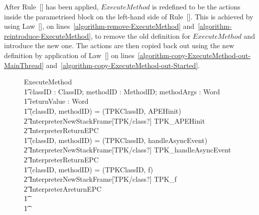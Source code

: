 After Rule~[] has been applied,
$ExecuteMethod$ is redefined to be the actions inside the parametrised
block on the left-hand side of
Rule~[].
This is achieved by using Law~[], on
lines~\ref{algorithm-remove-ExecuteMethod}
and~\ref{algorithm-reintroduce-ExecuteMethod}, to remove the old
definition for $ExecuteMethod$ and introduce the new one.
The actions are then copied back out using the new definition by
application of Law~[] on
lines~\ref{algorithm-copy-ExecuteMethod-out-MainThread}
and~\ref{algorithm-copy-ExecuteMethod-out-Started}.

\begin{figure}[tp!]
  \centering
  \setlength{\zedtab}{0.4cm}
  \setlength{\zedindent}{0pt}
  \setlength{\zedleftsep}{0pt}
  \setlength{\abovedisplayskip}{0pt}
  \setlength{\belowdisplayskip}{0pt}
  \setlength{\abovedisplayshortskip}{0pt}
  \setlength{\belowdisplayshortskip}{0pt}
  \begin{circusaction}
    ExecuteMethod \circdef \\
    \t1 \circval classID : ClassID; \circval methodID : MethodID; \circval methodArgs : \seq Word \circspot \\
    \t1 \circres returnValue : Word \circspot \\
    \t1 \circif (classID, methodID) = (TPKClassID, APEHinit) \circthen {} \\
    \t2 InterpreterNewStackFrame[TPK/class?] \circseq TPK\_APEHinit \circseq \\
    \t2 \lschexpract InterpreterReturnEPC \rschexpract  \\
    \t1 {} \circelse (classID, methodID) = (TPKClassID, handleAsyncEvent) \circthen {} \\
    \t2 InterpreterNewStackFrame[TPK/class?] \circseq TPK\_handleAsyncEvent \circseq \\
    \t2 \lschexpract InterpreterReturnEPC \rschexpract \\
    \t1 {} \circelse (classID, methodID) = (TPKClassID, f) \circthen {} \\
    \t2 InterpreterNewStackFrame[TPK/class?] \circseq TPK\_f \circseq \\
    \t2 \lschexpract InterpreterAreturnEPC \rschexpract \\
    \t1 {} \cdots {} \\
    \t1 \circfi
  \end{circusaction}


\end{figure}
